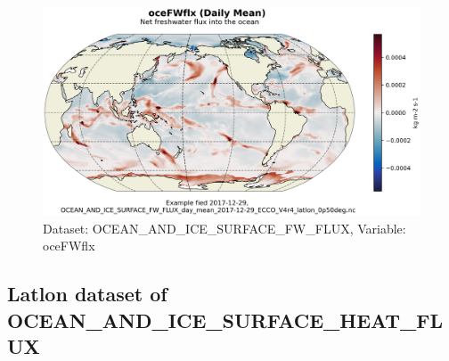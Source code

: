 \begin{figure}[H]
\centering
\includegraphics[scale=0.55]{../images/plots/latlon_plots/Ocean_and_Sea-Ice_Surface_Freshwater_Fluxes/oceFWflx.png}
\caption{Dataset: OCEAN\_AND\_ICE\_SURFACE\_FW\_FLUX, Variable: oceFWflx}
\label{tab:table-OCEAN_AND_ICE_SURFACE_FW_FLUX_oceFWflx-Plot}
\end{figure}
\subsection{Latlon dataset of OCEAN\_AND\_ICE\_SURFACE\_HEAT\_FLUX}
\newp

